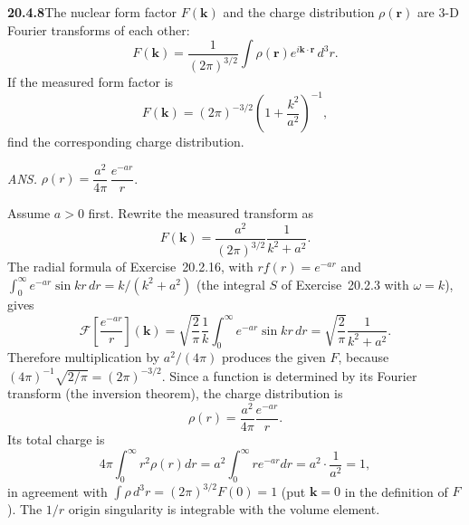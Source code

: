 \par\bigskip
\noindent\textbf{20.4.8}\quad The nuclear form factor
$F(\mathbf{k})$ and the charge distribution $\rho(\mathbf{r})$
are 3-D Fourier transforms of each other:
\[
F(\mathbf{k})=\frac{1}{(2\pi)^{3/2}}\int
\rho(\mathbf{r})e^{i\mathbf{k}\cdot\mathbf{r}}\,d^{3}r.
\]
If the measured form factor is
\[
F(\mathbf{k})=(2\pi)^{-3/2}\left(1+\frac{k^{2}}{a^{2}}\right)^{-1},
\]
find the corresponding charge distribution.
\par\nobreak\hfill\emph{ANS.}\enspace
$\rho(r)=\dfrac{a^{2}}{4\pi}\,\dfrac{e^{-ar}}{r}$.
\par{}
\solution
Assume $a>0$ first. Rewrite the measured transform as
\[
F(\mathbf k)=\frac{a^2}{(2\pi)^{3/2}}\frac1{k^2+a^2}.
\]
The radial formula of Exercise~20.2.16, with $rf(r)=e^{-ar}$ and
$\int_0^\infty e^{-ar}\sin kr\,dr=k/(k^2+a^2)$ (the integral $S$
of Exercise~20.2.3 with $\omega=k$), gives
\[
\mathcal F\left[\frac{e^{-ar}}r\right](\mathbf k)
=\sqrt{\frac2\pi}\frac1k\int_0^\infty e^{-ar}\sin kr\,dr
=\sqrt{\frac2\pi}\frac1{k^2+a^2}.
\]
Therefore multiplication by $a^2/(4\pi)$ produces the given
$F$, because $(4\pi)^{-1}\sqrt{2/\pi}=(2\pi)^{-3/2}$.
Since a function is determined by its Fourier transform (the
inversion theorem), the charge distribution is
\[
\boxed{\rho(r)=\frac{a^2}{4\pi}\frac{e^{-ar}}r}.
\]
Its total charge is
\[
4\pi\int_0^\infty r^2\rho(r)dr
=a^2\int_0^\infty re^{-ar}dr=a^2\cdot\frac1{a^2}=1,
\]
in agreement with $\int\rho\,d^3r=(2\pi)^{3/2}F(0)=1$ (put
$\mathbf k=0$ in the definition of $F$). The $1/r$ origin
singularity is integrable with the volume element.

